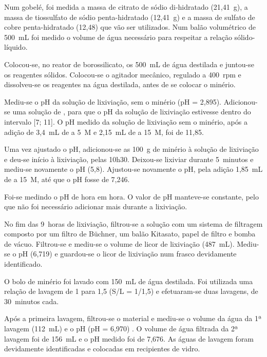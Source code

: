 Num gobelé, foi medida a massa de citrato de sódio di-hidratado (21,41~g), a massa de tiossulfato de sódio penta-hidratado (12,41~g) e a massa de sulfato de cobre penta-hidratado (12,48) que vão ser utilizados.
Num balão volumétrico de 500~mL foi medido o volume de água necessário para respeitar a relação sólido-líquido.

Colocou-se, no reator de borossilicato, os 500~mL de água destilada e juntou-se os reagentes sólidos.
Colocou-se o agitador mecânico, regulado a 400~rpm e dissolveu-se os reagentes na água destilada, antes de se colocar o minério.

Mediu-se o pH da solução de lixiviação, sem o minério (pH = 2,895).
Adicionou-se uma solução de \hidso{}, para que o pH da solução de lixiviação estivesse dentro do intervalo [7; 11].
O pH medido da solução de lixiviação sem o minério, após a adição de 3,4~mL de \hidso{} a 5~M e 2,15~mL de \hidso{} a 15~M, foi de 11,85.

Uma vez ajustado o pH, adicionou-se as 100~g de minério à solução de lixiviação e deu-se início à lixiviação, pelas 10h30.
Deixou-se lixiviar durante 5~minutos e mediu-se novamente o pH (5,8).
Ajustou-se novamente o pH, pela adição 1,85~mL de \hidso{} a 15~M, até que o pH fosse de 7,246.

Foi-se medindo o pH de hora em hora. 
O valor de pH manteve-se constante, pelo que não foi necessário adicionar mais \hidso{} durante a lixiviação.

No fim das 9~horas de lixiviação, filtrou-se a solução com um sistema de filtragem composto por um filtro de Büchner, um balão Kitasato, papel de filtro e bomba de vácuo.
Filtrou-se e mediu-se o volume de licor de lixiviação (487~mL). 
Mediu-se o pH (6,719) e guardou-se o licor de lixiviação num frasco devidamente identificado.

O bolo de minério foi lavado com 150~mL de água destilada. 
Foi utilizada uma relação de lavagem de 1 para 1,5 (S/L = 1/1,5) e efetuaram-se duas lavagens, de 30~minutos cada.

Após a primeira lavagem, filtrou-se o material e mediu-se o volume da água da 1ª lavagem (112~mL) e o pH (pH = 6,970) .
O volume de água filtrada da 2ª lavagem foi de 156~mL e o pH medido foi de 7,676.
As águas de lavagem foram devidamente identificadas e colocadas em recipientes de vidro.

